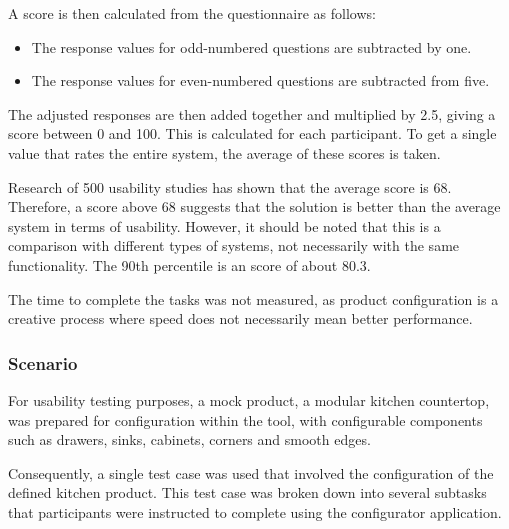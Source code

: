 A score is then calculated from the  questionnaire as follows:
\begin{itemize}[label=\rectanglebullet]
    \item The response values for odd-numbered questions are subtracted by one.
    \item The response values for even-numbered questions are subtracted from five.
\end{itemize}
The adjusted responses are then added together and multiplied by 2.5, giving a score between 0 and 100. This is calculated for each participant. To get a single value that rates the entire system, the average of these scores is taken.~\cite{Sauro2011}

Research of 500 usability studies has shown that the average  score is 68. Therefore, a score above 68 suggests that the solution is better than the average system in terms of usability. However, it should be noted that this is a comparison with different types of systems, not necessarily with the same functionality. The 90th percentile is an  score of about 80.3. \cite{Sauro2011}

The time to complete the tasks was not measured, as product configuration is a creative process where speed does not necessarily mean better performance. 


\subsubsection{Scenario}

For usability testing purposes, a mock product, a modular kitchen countertop, was prepared for configuration within the tool, with configurable components such as drawers, sinks, cabinets, corners and smooth edges.

Consequently, a single test case was used that involved the configuration of the defined kitchen product. This test case was broken down into several subtasks that participants were instructed to complete using the configurator application.

